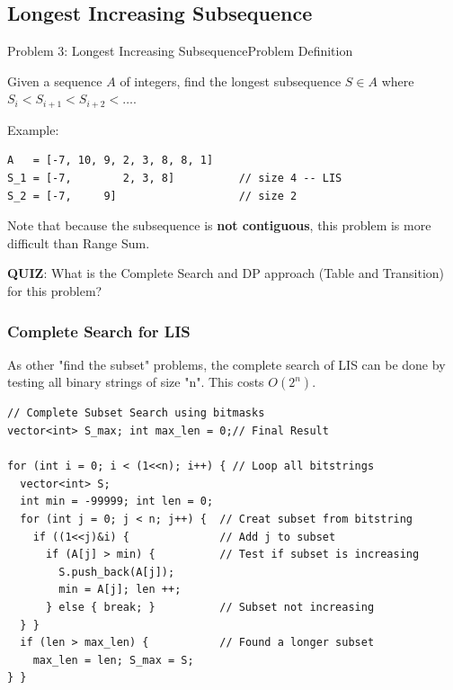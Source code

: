 \subsection{Longest Increasing Subsequence}

\begin{frame}[fragile]{Problem 3: Longest Increasing Subsequence}{Problem Definition}
  \begin{block}{}
    Given a sequence $A$ of integers, find the longest subsequence $S \in A$ where $S_i < S_{i+1} < S_{i+2} < \ldots$.
  \end{block}
  \bigskip

  Example:
\begin{verbatim}
A   = [-7, 10, 9, 2, 3, 8, 8, 1]
S_1 = [-7,        2, 3, 8]          // size 4 -- LIS
S_2 = [-7,     9]                   // size 2
\end{verbatim}
\bigskip

Note that because the subsequence is {\bf not contiguous}, this problem is more difficult than Range Sum.
\bigskip

{\bf QUIZ}: What is the \alert{Complete Search} and \alert{DP approach} (Table and Transition) for this problem?
\end{frame}

\begin{frame}[fragile]
  \frametitle{Complete Search for LIS}

  As other "find the subset" problems, the complete search of LIS can be done by testing all binary strings of size "n". This costs $O(2^n)$.
  \smallskip

  \begin{block}{}
    {\smaller
\begin{verbatim}
// Complete Subset Search using bitmasks
vector<int> S_max; int max_len = 0;// Final Result

for (int i = 0; i < (1<<n); i++) { // Loop all bitstrings
  vector<int> S;
  int min = -99999; int len = 0;
  for (int j = 0; j < n; j++) {  // Creat subset from bitstring
    if ((1<<j)&i) {              // Add j to subset
      if (A[j] > min) {          // Test if subset is increasing
        S.push_back(A[j]);
        min = A[j]; len ++;
      } else { break; }          // Subset not increasing
  } }
  if (len > max_len) {           // Found a longer subset
    max_len = len; S_max = S;
} }
\end{verbatim}
    }
  \end{block}
\end{frame}

